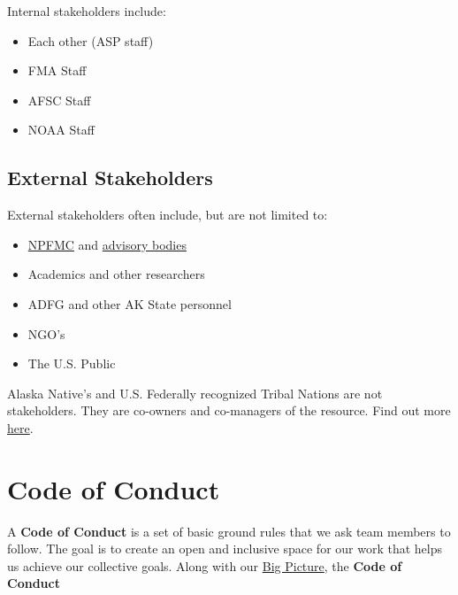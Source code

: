 \documentclass[
  letterpaper,
  DIV=11,
  numbers=noendperiod]{scrreprt}
\providecommand{\tightlist}{%
  \setlength{\itemsep}{0pt}\setlength{\parskip}{0pt}}\usepackage{longtable,booktabs,array}
\begin{document}
Internal stakeholders include:

\begin{itemize}
\tightlist
\item
  Each other (ASP staff)
\item
  FMA Staff\\
\item
  AFSC Staff\\
\item
  NOAA Staff
\end{itemize}

\section{External Stakeholders}\label{external-stakeholders}

External stakeholders often include, but are not limited to:

\begin{itemize}
\tightlist
\item
  \href{https://www.npfmc.org/}{NPFMC} and
  \href{https://www.npfmc.org/about-the-council/advisory-groups/}{advisory
  bodies}\\
\item
  Academics and other researchers\\
\item
  ADFG and other AK State personnel\\
\item
  NGO's\\
\item
  The U.S. Public
\end{itemize}

Alaska Native's and U.S. Federally recognized Tribal Nations are not
stakeholders. They are co-owners and co-managers of the resource. Find
out more
\href{https://www.noaa.gov/sites/default/files/2023-06/NOAA_Tribal_Consultation_Handbook\%202023_FINAL.pdf}{here}.


\chapter{\texorpdfstring{Code of Conduct
\hspace{1cm}}{Code of Conduct }}\label{sec-code-of-conduct}

A \textbf{Code of Conduct} is a set of basic ground rules that we ask
team members to follow. The goal is to create an open and inclusive
space for our work that helps us achieve our collective goals. Along
with our \hyperref[sec-big_picture]{Big Picture}, the \textbf{Code of
Conduct}
\end{document}
